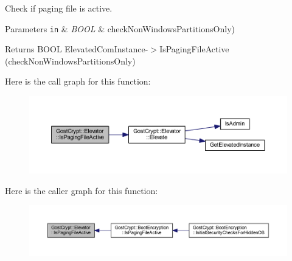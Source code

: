 Check if paging file is active. 


\begin{DoxyParams}[1]{Parameters}
\mbox{\tt in}  & {\em B\+O\+OL} & check\+Non\+Windows\+Partitions\+Only) \\
\hline
\end{DoxyParams}
\begin{DoxyReturn}{Returns}
B\+O\+OL Elevated\+Com\+Instance-\/$>$Is\+Paging\+File\+Active (check\+Non\+Windows\+Partitions\+Only) 
\end{DoxyReturn}
Here is the call graph for this function\+:
\nopagebreak
\begin{figure}[H]
\begin{center}
\leavevmode
\includegraphics[width=350pt]{class_gost_crypt_1_1_elevator_a2ebe7f1b09bc239343ec039ac6748543_cgraph}
\end{center}
\end{figure}
Here is the caller graph for this function\+:
\nopagebreak
\begin{figure}[H]
\begin{center}
\leavevmode
\includegraphics[width=350pt]{class_gost_crypt_1_1_elevator_a2ebe7f1b09bc239343ec039ac6748543_icgraph}
\end{center}
\end{figure}
\mbox{\label{class_gost_crypt_1_1_elevator_af444333e649b29c3640242ded59cb673}} 
